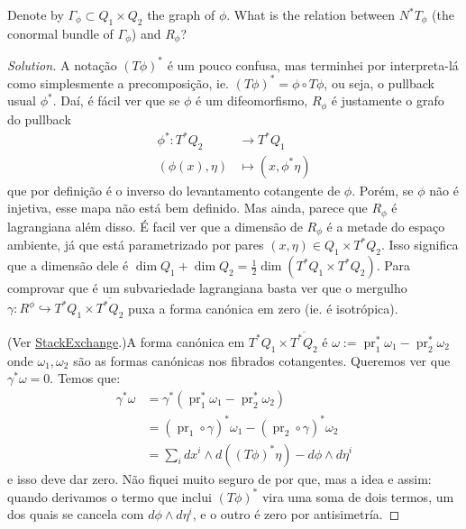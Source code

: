Denote by $\Gamma_\phi\subset Q_1\times Q_2$ the graph of $\phi$. What is the relation between $N^*T_\phi$ (the conormal bundle of $\Gamma_\phi$) and  $R_\phi$?

\begin{proof}[Solution]\leavevmode
	A nota\c c\~ao $(T\phi)^*$ \'e um pouco confusa, mas terminhei por interpreta-l\'a como simplesmente a precomposi\c c\~ao, ie. $(T\phi)^*=\phi\circ T\phi$, ou seja, o pullback usual $\phi^*$. Da\'i, \'e f\'acil ver que se $\phi$ \'e um difeomorfismo, $R_\phi$ \'e justamente o grafo do pullback
	\begin{align*}
		\phi^*: T^*Q_2 &\longrightarrow T^*Q_1 \\
		(\phi(x),\eta ) &\longmapsto (x,\phi^*\eta )
	\end{align*}
que por defini\c c\~ao \'e o inverso do levantamento cotangente de $\phi$. Por\'em, se $\phi $ n\~ao \'e injetiva, esse mapa n\~ao est\'a bem definido. Mas ainda, parece que $R_\phi$ \'e lagrangiana al\'em disso. \'E facil ver que a dimens\~ao de $R_\phi$ \'e a metade do espaço ambiente, j\'a que est\'a parametrizado por pares $(x,\eta)\in Q_1\times T^*Q_2$. Isso significa que a dimens\~ao dele \'e $\dim Q_1+\dim Q_2=\frac{1}{2}\dim (T^*Q_1\times T^*Q_2)$. Para comprovar que \'e um subvariedade lagrangiana basta ver que o mergulho $\gamma:R^{\phi} \hookrightarrow T^*Q_1\times \overline{T^*Q_2}$ puxa a forma can\'onica em zero (ie. \'e isotr\'opica).

(Ver \href{https://math.stackexchange.com/questions/2859956/conormal-bundle-and-lagrangian-submanifold}{StackExchange}.)A forma can\'onica em $T^*Q_1\times \overline{T^*Q_2}$ \'e $ \omega:=\operatorname{pr}_1^*\omega_1-\operatorname{pr}_2^*\omega_2$ onde $ \omega_1,\omega_2$ s\~ao as formas can\'onicas nos fibrados cotangentes. Queremos ver que $\gamma^*\omega=0$.
Temos que:
\begin{align*}
	 \gamma^*\omega&= \gamma^* (\operatorname{pr}_1^*\omega_1-\operatorname{pr}_2^*\omega_2)\\
	 &=(\operatorname{pr}_1\circ \gamma)^*\omega_1-(\operatorname{pr}_2\circ  \gamma)^*\omega_2\\
	 &=\sum_{i}dx^i\wedge d((T\phi )^*\eta )-d\phi \wedge d\eta^i
\end{align*}
e isso deve dar zero. Não fiquei muito seguro de por que, mas a idea e assim: quando derivamos o termo que inclui $(T\phi)^*$ vira uma soma de dois termos, um dos quais se cancela com  $d\phi \wedge d\eta^i$, e o outro \'e zero por antisimetr\'ia.


\end{proof}
